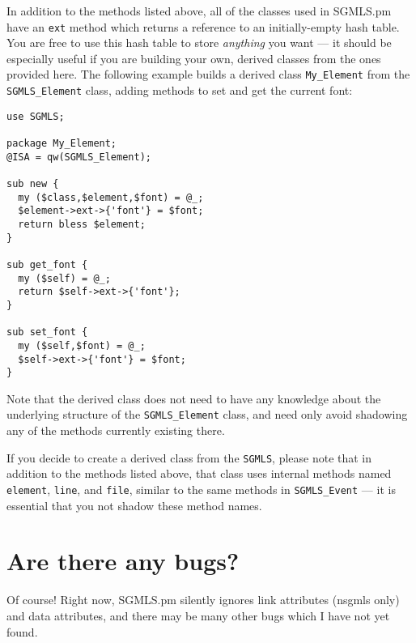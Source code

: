 In addition to the methods listed above, all of the classes used
in {\sc SGMLS.pm} have an {\tt ext} method which returns a
reference to an initially-empty hash table.  You are free to use this
hash table to store {\em anything\/} you want {---} it
should be especially useful if you are building your own, derived
classes from the ones provided here.  The following example builds a
derived class {\tt My\_Element} from the {\tt SGMLS\_Element}
class, adding methods to set and get the current font:

{\footnotesize\begin{verbatim}
use SGMLS;

package My_Element;
@ISA = qw(SGMLS_Element);

sub new {
  my ($class,$element,$font) = @_;
  $element->ext->{'font'} = $font;
  return bless $element;
}

sub get_font {
  my ($self) = @_;
  return $self->ext->{'font'};
}

sub set_font {
  my ($self,$font) = @_;
  $self->ext->{'font'} = $font;
}
\end{verbatim}}

Note that the derived class does not need to have any knowledge
about the underlying structure of the {\tt SGMLS\_Element}
class, and need only avoid shadowing any of the methods currently
existing there.

If you decide to create a derived class from the {\tt SGMLS}, please note that in
addition to the methods listed above, that class uses internal methods
named {\tt element}, {\tt line}, and
{\tt file}, similar to the same methods in {\tt SGMLS\_Event} {---}
it is essential that you not shadow these method names.




\section{Are there any bugs?}
\label{BUGS}


Of course!  Right now, {\sc SGMLS.pm} silently ignores link attributes
({\sc nsgmls} only) and data attributes, and there may be many other bugs
which I have not yet found.



